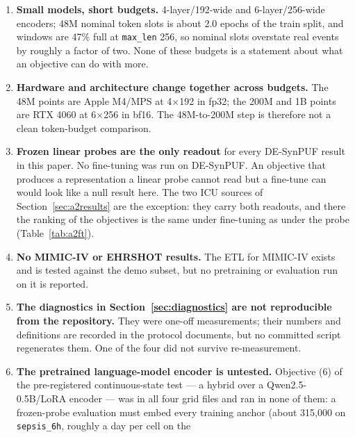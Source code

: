 \documentclass[11pt,a4paper]{article}
\newcommand{\code}[1]{\texttt{\small #1}}
\begin{document}
\begin{enumerate}[leftmargin=*,itemsep=3pt,topsep=3pt]
      of which 5.76M is the $30{,}000 \times 192$ code table. At the scale
      config it is 7{,}905{,}536 of 13{,}208{,}336 for the hybrid (60\%) and of
      12{,}665{,}104 for \code{ar} (62\%). Encoder capacity is a minority of
      what is being trained at both sizes, so ``scaling tokens'' here is not
      scaling a model in the usual sense.
\item \textbf{Small models, short budgets.} 4-layer/192-wide and
      6-layer/256-wide encoders; 48M nominal token slots is about 2.0 epochs of
      the train split, and windows are 47\% full at \code{max\_len} 256, so
      nominal slots overstate real events by roughly a factor of two. None of
      these budgets is a statement about what an objective can do with more.
\item \textbf{Hardware and architecture change together across budgets.} The
      48M points are Apple M4/MPS at 4$\times$192 in fp32; the 200M and 1B
      points are RTX 4060 at 6$\times$256 in bf16. The 48M-to-200M step is
      therefore not a clean token-budget comparison.
\item \textbf{Frozen linear probes are the only readout} for every DE-SynPUF
      result in this paper. No fine-tuning was
      run on DE-SynPUF. An objective that produces a representation a linear probe cannot
      read but a fine-tune can would look like a null result here. The two
      ICU sources of Section~\ref{sec:a2results} are the exception: they
      carry both readouts, and there the ranking of the objectives is the same
      under fine-tuning as under the probe (Table~\ref{tab:a2ft}).
\item \textbf{No MIMIC-IV or EHRSHOT results.} The ETL for MIMIC-IV exists and
      is tested against the demo subset, but no pretraining or evaluation run on
      it is reported.
\item \textbf{The diagnostics in Section~\ref{sec:diagnostics} are not
      reproducible from the repository.} They were one-off measurements; their
      numbers and definitions are recorded in the protocol documents, but no
      committed script regenerates them. One of the four did not survive
      re-measurement.
\item \textbf{The pretrained language-model encoder is untested.} Objective
      (6) of the pre-registered continuous-state test --- a hybrid over a
      Qwen2.5-0.5B/LoRA encoder --- was in all four grid files and ran in
      none of them: a frozen-probe evaluation must embed every training anchor
      (about 315{,}000 on \code{sepsis\_6h}, roughly a day per cell on the

\end{enumerate}
\end{document}
